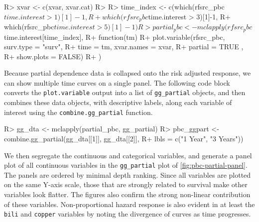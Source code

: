 \documentclass[article]{jss}
\begin{document}
\begin{Schunk}
\begin{Sinput}
R> xvar <- c(xvar, xvar.cat)
R> 
R> time_index <- c(which(rfsrc_pbc$time.interest > 1)[1]-1,  
R+                 which(rfsrc_pbc$time.interest > 3)[1]-1,  
R+                 which(rfsrc_pbc$time.interest > 5)[1]-1)
R> partial_pbc <- mclapply(rfsrc_pbc$time.interest[time_index],
R+                         function(tm){
R+                           plot.variable(rfsrc_pbc, surv.type = "surv", 
R+                                         time = tm, xvar.names = xvar,
R+                                         partial = TRUE , 
R+                                         show.plots = FALSE)
R+                         })
\end{Sinput}
\end{Schunk}

Because partial dependence data is collapsed onto the risk adjusted
response, we can show multiple time curves on a single panel. The
following code block converts the \texttt{plot.variable} output into a
list of \texttt{gg\_partial} objects, and then combines these data
objects, with descriptive labels, along each variable of interest using
the \texttt{combine.gg\_partial} function.

\begin{Schunk}
\begin{Sinput}
R> gg_dta <- mclapply(partial_pbc, gg_partial)
R> pbc_ggpart <- combine.gg_partial(gg_dta[[1]], gg_dta[[2]],
R+                                  lbls = c("1 Year", "3 Years"))
\end{Sinput}
\end{Schunk}

We then segregate the continuous and categorical variables, and generate
a panel plot of all continuous variables in the \texttt{gg\_partial}
plot of \autoref{fig:pbc-partial-panel}. The panels are ordered by
minimal depth ranking. Since all variables are plotted on the same
Y-axis scale, those that are strongly related to survival make other
variables look flatter. The figures also confirm the strong non-linear
contribution of these variables. Non-proportional hazard response is
also evident in at least the \texttt{bili} and \texttt{copper} variables
by noting the divergence of curves as time progresses.
\end{document}
